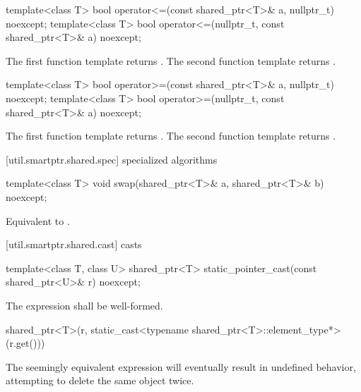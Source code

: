 %
\begin{itemdecl}
template<class T>
  bool operator<=(const shared_ptr<T>& a, nullptr_t) noexcept;
template<class T>
  bool operator<=(nullptr_t, const shared_ptr<T>& a) noexcept;
\end{itemdecl}

\begin{itemdescr}
\pnum
\returns
The first function template returns .
The second function template returns .
\end{itemdescr}

%
\begin{itemdecl}
template<class T>
  bool operator>=(const shared_ptr<T>& a, nullptr_t) noexcept;
template<class T>
  bool operator>=(nullptr_t, const shared_ptr<T>& a) noexcept;
\end{itemdecl}

\begin{itemdescr}
\pnum
\returns
The first function template returns .
The second function template returns .
\end{itemdescr}

[util.smartptr.shared.spec]{ specialized algorithms}

%
\begin{itemdecl}
template<class T>
  void swap(shared_ptr<T>& a, shared_ptr<T>& b) noexcept;
\end{itemdecl}

\begin{itemdescr}
\pnum\effects  Equivalent to .
\end{itemdescr}

[util.smartptr.shared.cast]{ casts}

%
\begin{itemdecl}
template<class T, class U>
  shared_ptr<T> static_pointer_cast(const shared_ptr<U>& r) noexcept;
\end{itemdecl}

\begin{itemdescr}
\pnum
\requires The expression  shall
be well-formed.

\pnum
\returns
\begin{codeblock}
shared_ptr<T>(r, static_cast<typename shared_ptr<T>::element_type*>(r.get()))
\end{codeblock}

\pnum
\begin{note}
The seemingly equivalent expression
will eventually result in undefined behavior, attempting to delete the
same object twice.
\end{note}
\end{itemdescr}

